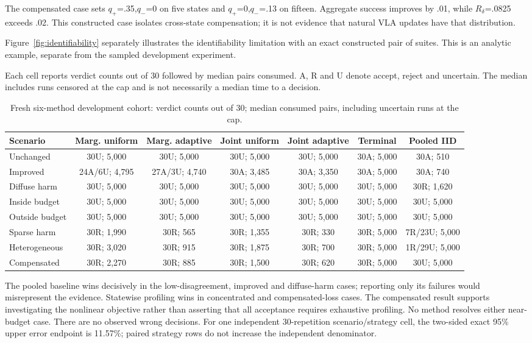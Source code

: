 \documentclass[conference]{IEEEtran}
\begin{document}
The compensated case sets $q_+$=.35,$q_-$=0 on five states and $q_+$=0,$q_-$=.13 on fifteen. Aggregate success improves by .01, while $R_\delta$=.0825 exceeds .02. This constructed case isolates cross-state compensation; it is not evidence that natural VLA updates have that distribution.

Figure~\ref{fig:identifiability} separately illustrates the identifiability limitation with an exact constructed pair of suites. This is an analytic example, separate from the sampled development experiment.

Each cell reports verdict counts out of 30 followed by median pairs consumed. A, R and U denote accept, reject and uncertain. The median includes runs censored at the cap and is not necessarily a median time to a decision.

\begin{table}[t]\centering\caption{Fresh six-method development cohort: verdict counts out of 30; median consumed pairs, including uncertain runs at the cap.}\small
\begin{tabular}{lcccccc}\toprule
Scenario & Marg. uniform & Marg. adaptive & Joint uniform & Joint adaptive & Terminal & Pooled IID \\
\midrule
Unchanged & 30U; 5,000 & 30U; 5,000 & 30U; 5,000 & 30U; 5,000 & 30A; 5,000 & 30A; 510 \\
Improved & 24A/6U; 4,795 & 27A/3U; 4,740 & 30A; 3,485 & 30A; 3,350 & 30A; 5,000 & 30A; 740 \\
Diffuse harm & 30U; 5,000 & 30U; 5,000 & 30U; 5,000 & 30U; 5,000 & 30U; 5,000 & 30R; 1,620 \\
Inside budget & 30U; 5,000 & 30U; 5,000 & 30U; 5,000 & 30U; 5,000 & 30U; 5,000 & 30U; 5,000 \\
Outside budget & 30U; 5,000 & 30U; 5,000 & 30U; 5,000 & 30U; 5,000 & 30U; 5,000 & 30U; 5,000 \\
Sparse harm & 30R; 1,990 & 30R; 565 & 30R; 1,355 & 30R; 330 & 30R; 5,000 & 7R/23U; 5,000 \\
Heterogeneous & 30R; 3,020 & 30R; 915 & 30R; 1,875 & 30R; 700 & 30R; 5,000 & 1R/29U; 5,000 \\
Compensated & 30R; 2,270 & 30R; 885 & 30R; 1,500 & 30R; 620 & 30R; 5,000 & 30U; 5,000 \\
\bottomrule\end{tabular}
\end{table}

The pooled baseline wins decisively in the low-disagreement, improved and diffuse-harm cases; reporting only its failures would misrepresent the evidence. Statewise profiling wins in concentrated and compensated-loss cases. The compensated result supports investigating the nonlinear objective rather than asserting that all acceptance requires exhaustive profiling. No method resolves either near-budget case. There are no observed wrong decisions. For one independent 30-repetition scenario/strategy cell, the two-sided exact 95\% upper error endpoint is 11.57\%; paired strategy rows do not increase the independent denominator.
\end{document}
